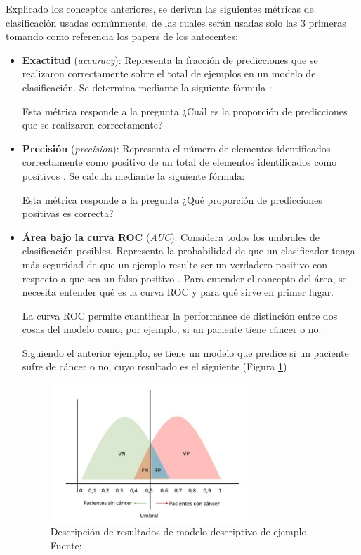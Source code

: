 Explicado los conceptos anteriores, se derivan las siguientes métricas de clasificación usadas comúnmente, de las cuales serán usadas solo las 3 primeras tomando como referencia los papers de los antecentes:
\begin{itemize}
	\item \textbf{Exactitud} (\textit{accuracy}): Representa la fracción de predicciones que se realizaron correctamente sobre el total de ejemplos en un modelo de clasificación. Se determina mediante la siguiente fórmula \parencite{gl_kohavi1998ml_glossary}:
	
	Esta métrica responde a la pregunta ¿Cuál es la proporción de predicciones que se realizaron correctamente? \parencite{gl_izco2018bdc}
	
	\item \textbf{Precisión} (\textit{precision}): Representa el número de elementos identificados correctamente como positivo de un total de elementos identificados como positivos \parencite{gl_bigdata2019metricas}. Se calcula mediante la siguiente fórmula:
	
	Esta métrica responde a la pregunta ¿Qué proporción de predicciones positivas es correcta? \parencite{gl_izco2018bdc}
	
	\item \textbf{Área bajo la curva ROC} (\textit{AUC}): Considera todos los umbrales de clasificación posibles. Representa la probabilidad de que un clasificador tenga más seguridad de que un ejemplo resulte ser un verdadero positivo con respecto a que sea un falso positivo \parencite{gl_google2018machinelearning}. Para entender el concepto del área, se necesita entender qué es la curva ROC y para qué sirve en primer lugar.
	
	La curva ROC permite cuantificar la performance de distinción entre dos cosas del modelo como, por ejemplo, si un paciente tiene cáncer o no.
	
	Siguiendo el anterior ejemplo, se tiene un modelo que predice si un paciente sufre de cáncer o no, cuyo resultado es el siguiente (Figura \ref{3:fig2})
	
	\begin{figure}[htbp]
		\begin{center}
			\includegraphics[width=0.7\textwidth]{3/figures/auc_example.jpg}
			\caption{Descripción de resultados de modelo descriptivo de ejemplo. Fuente: \parencite{gl_gonzalez2019auc}}
			\label{3:fig2}
		\end{center}
	\end{figure}
	

\end{itemize}
